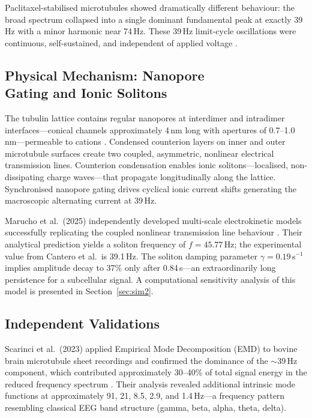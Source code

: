 \documentclass[10pt, a4paper, twocolumn]{article}
\begin{document}
Paclitaxel-stabilised microtubules showed dramatically different
behaviour: the broad spectrum collapsed into a single dominant
fundamental peak at exactly 39\,Hz with a minor harmonic near 74\,Hz.
These 39\,Hz limit-cycle oscillations were continuous, self-sustained,
and independent of applied voltage \cite{cantero2023}.

\subsection{Physical Mechanism: Nanopore\\ Gating and Ionic Solitons}

The tubulin lattice contains regular nanopores at interdimer and
intradimer interfaces---conical channels approximately 4\,nm long with
apertures of 0.7--1.0\,nm---permeable to cations
\cite{freedman2010,marucho2025}. Condensed counterion layers on inner
and outer microtubule surfaces create two coupled, asymmetric, nonlinear
electrical transmission lines. Counterion condensation enables ionic
solitons---localised, non-dissipating charge waves---that propagate
longitudinally along the lattice. Synchronised nanopore gating drives
cyclical ionic current shifts generating the macroscopic alternating
current at 39\,Hz.

Marucho et al.\ (2025) independently developed multi-scale
electrokinetic models successfully replicating the coupled nonlinear
transmission line behaviour \cite{marucho2025}. Their analytical
prediction yields a soliton frequency of $f = 45.77$\,Hz; the
experimental value from Cantero et al.\ is 39.1\,Hz. The soliton
damping parameter $\gamma = 0.19$\,s$^{-1}$ implies amplitude decay to
37\% only after 0.84\,s---an extraordinarily long persistence for a
subcellular signal. A computational sensitivity analysis of this model
is presented in Section~\ref{sec:sim2}.

\subsection{Independent Validations}

Scarinci et al.\ (2023) applied Empirical Mode Decomposition (EMD)
to bovine brain microtubule sheet recordings and confirmed the
dominance of the $\sim$39\,Hz component, which contributed
approximately 30--40\% of total signal energy in the reduced
frequency spectrum \cite{scarinci2023}. Their analysis revealed
additional intrinsic mode functions at approximately 91, 21, 8.5,
2.9, and 1.4\,Hz---a frequency pattern resembling classical EEG
band structure (gamma, beta, alpha, theta, delta).
\end{document}
